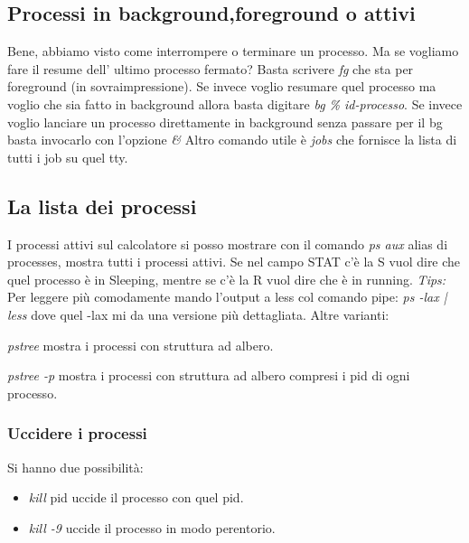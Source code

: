 \documentclass[a4paper,12pt]{article} %
\begin{document}
\subsection{Processi in background,foreground o attivi}
Bene, abbiamo visto come interrompere o terminare un processo. Ma se vogliamo fare il resume dell' ultimo processo fermato?
Basta scrivere \textit{fg} che sta per foreground (in sovraimpressione).
Se invece voglio resumare quel processo ma voglio che sia fatto in background allora basta digitare \textit{bg \% id-processo}.
Se invece voglio lanciare un processo direttamente in background senza passare per il bg basta invocarlo con l'opzione \textit{\&}
Altro comando utile è \textit{jobs} che fornisce la lista di tutti i job su quel tty.
\subsection{La lista dei processi}
I processi attivi sul calcolatore si posso mostrare con il comando \textit{ps aux} alias di processes, mostra tutti i processi attivi.
Se nel campo STAT c'è la S vuol dire che quel processo è in Sleeping, mentre se c'è la R vuol dire che è in running.
\textit{Tips:} Per leggere più comodamente mando l'output a less col comando pipe: \textit{ps -lax | less} dove quel -lax mi da una versione più dettagliata.
Altre varianti:
\begin{description}
\item \textit{pstree} mostra i processi con struttura ad albero.
\item \textit{pstree -p} mostra i processi con struttura ad albero compresi i pid di ogni processo.
\end{description}
\subsubsection{Uccidere i processi}
Si hanno due possibilità:
\begin{itemize}
\item \textit{kill} pid uccide il processo con quel pid.
\item \textit{kill -9} uccide il processo in modo perentorio.
\end{itemize}
\end{document}
